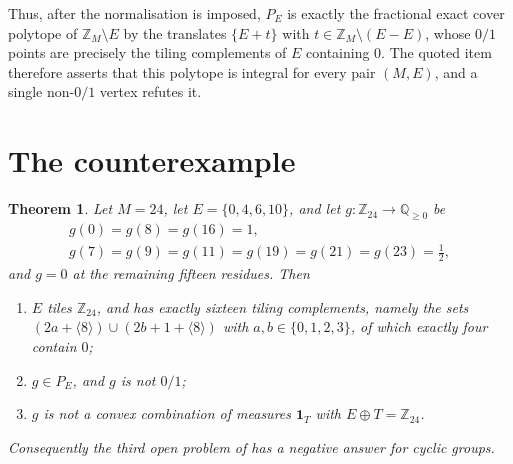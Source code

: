 \documentclass[11pt]{amsart}
\newtheorem{theorem}{Theorem}
\theoremstyle{definition}
\theoremstyle{remark}
\newcommand{\ZM}{\mathbb Z_M}
\newcommand{\Zn}[1]{\mathbb Z_{#1}}
\newcommand{\one}{\mathbf 1}
\begin{document}
Thus, after the normalisation is imposed, $P_E$ is exactly the fractional exact
cover polytope of $\ZM\setminus E$ by the translates $\{E+t\}$ with
$t\in\ZM\setminus(E-E)$, whose $0/1$ points are precisely the tiling
complements of $E$ containing $0$. The quoted item therefore asserts that this
polytope is integral for every pair $(M,E)$, and a single non-$0/1$ vertex
refutes it.

\section{The counterexample}

\begin{theorem}\label{thm:main}
Let $M=24$, let $E=\{0,4,6,10\}$, and let $g\colon\Zn{24}\to\mathbb Q_{\ge0}$ be
\begin{gather*}
  g(0)=g(8)=g(16)=1,\\
  g(7)=g(9)=g(11)=g(19)=g(21)=g(23)=\tfrac12,
\end{gather*}
and $g=0$ at the remaining fifteen residues. Then
\begin{enumerate}
\item[(i)] $E$ tiles $\Zn{24}$, and has exactly sixteen tiling complements,
namely the sets $(2a+\langle 8\rangle)\cup(2b+1+\langle8\rangle)$ with
$a,b\in\{0,1,2,3\}$, of which exactly four contain $0$;
\item[(ii)] $g\in P_E$, and $g$ is not $0/1$;
\item[(iii)] $g$ is not a convex combination of measures $\one_T$ with
$E\oplus T=\Zn{24}$.
\end{enumerate}
Consequently the third open problem of \cite{KF} has a negative answer for
cyclic groups.
\end{theorem}
\end{document}
